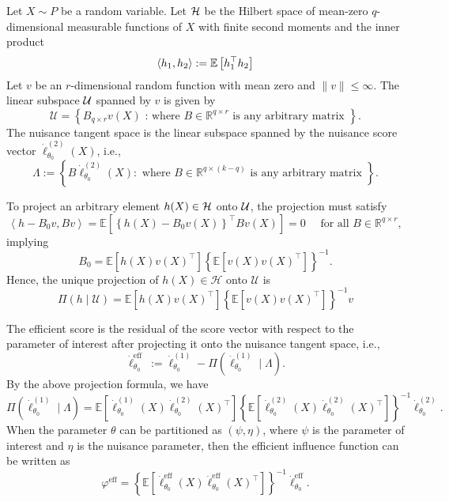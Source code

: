 Let $X \sim P$ be a random variable. Let $\mathcal{H}$ be the Hilbert space of mean-zero $q$-dimensional measurable functions of $X$ with finite second moments and the inner product
\begin{equation*}
    \left\langle h_1, h_2 \right\rangle := \mathbb{E} \left[h_1^\top h_2\right]
\end{equation*}
Let $v$ be an $r$-dimensional random function with mean zero and $\|v\| \leq \infty$. The linear subspace $\mathcal{U}$ spanned by $v$ is given by
\begin{equation*}
    \mathcal{U}=\left\{B_{q \times r} v(X) \text { : where } B \in \mathbb{R}^{q \times r} \text { is any arbitrary matrix }\right\} .
\end{equation*}
The nuisance tangent space is the linear subspace spanned by the nuisance score vector $\dot{\ell}_{\theta_0}^{(2)}(X)$, i.e.,
$$
\Lambda:=\left\{B \dot{\ell}_{\theta_0}^{(2)}(X): \text { where } B \in \mathbb{R}^{q \times(k-q)} \text { is any arbitrary matrix }\right\} .
$$

To project an arbitrary element $h(X) \in \mathcal{H}$ onto $\mathcal{U}$, the projection must satisfy
$$
\left\langle h-B_0 v, B v\right\rangle=\mathbb{E}\left[\left\{h(X)-B_0 v(X)\right\}^{\top} B v(X)\right]=0 \quad \text { for all } B \in \mathbb{R}^{q \times r},
$$
implying
$$
B_0=\mathbb{E}\left[h(X) v(X)^{\top}\right]\left\{\mathbb{E}\left[v(X) v(X)^{\top}\right]\right\}^{-1}.
$$
Hence, the unique projection of $h(X) \in \mathcal{H}$ onto $\mathcal{U}$ is
$$
\Pi(h \mid \mathcal{U})=\mathbb{E}\left[h(X) v(X)^{\top}\right]\left\{\mathbb{E}\left[v(X) v(X)^{\top}\right]\right\}^{-1} v
$$

The efficient score is the residual of the score vector with respect to the parameter of interest after projecting it onto the nuisance tangent space, i.e.,
$$
\dot{\ell}_{\theta_0}^{\text {eff }}:=\dot{\ell}_{\theta_0}^{(1)}-\Pi\left(\dot{\ell}_{\theta_0}^{(1)} \mid \Lambda\right) .
$$
By the above projection formula, we have
$$
\Pi\left(\dot{\ell}_{\theta_0}^{(1)} \mid \Lambda\right)=\mathbb{E}\left[\dot{\ell}_{\theta_0}^{(1)}(X) \dot{\ell}_{\theta_0}^{(2)}(X)^{\top}\right]\left\{\mathbb{E}\left[\dot{\ell}_{\theta_0}^{(2)}(X) \dot{\ell}_{\theta_0}^{(2)}(X)^{\top}\right]\right\}^{-1} \dot{\ell}_{\theta_0}^{(2)} .
$$
When the parameter $\theta$ can be partitioned as $(\psi, \eta)$, where $\psi$ is the parameter of interest and $\eta$ is the nuisance parameter, then the efficient influence function can be written as 
$$
\varphi^{\mathrm{eff}}=\left\{\mathbb{E}\left[\dot{\ell}_{\theta_0}^{\mathrm{eff}}(X) \dot{\ell}_{\theta_0}^{\mathrm{eff}}(X)^{\top}\right]\right\}^{-1} \dot{\ell}_{\theta_0}^{\mathrm{eff}} .
$$